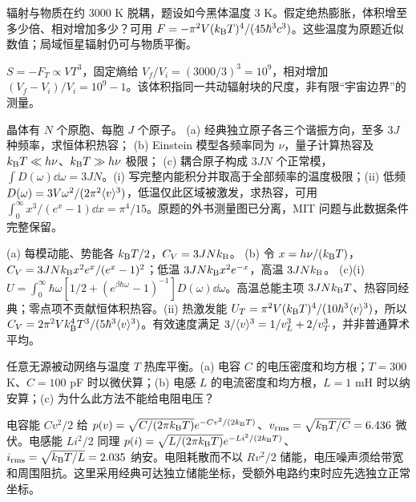 \begin{exercise}
辐射与物质在约 3000 K 脱耦，题设如今黑体温度 3 K。假定绝热膨胀，体积增至多少倍、相对增加多少？可用 $F=-\pi^2V(k_{\mathrm B} T)^4/(45\hbar^3c^3)$。这些温度为原题近似数值；局域恒星辐射仍可与物质平衡。
\end{exercise}
\begin{solution}
$S=-F_T\propto VT^3$，固定熵给 $V_f/V_i=(3000/3)^3=10^9$，相对增加 $(V_f-V_i)/V_i=10^9-1$。该体积指同一共动辐射块的尺度，非有限“宇宙边界”的测量。
\end{solution}
\begin{exercise}
晶体有 $N$ 个原胞、每胞 $J$ 个原子。
(a) 经典独立原子各三个谐振方向，至多 $3J$ 种频率，求恒体积热容；
(b) Einstein 模型各频率同为 $\nu$，量子计算热容及 $k_{\mathrm B} T\ll h\nu$、$k_{\mathrm B} T\gg h\nu$ 极限；
(c) 耦合原子构成 $3JN$ 个正常模，$\int D(\omega)\dd\omega=3JN$。(i) 写完整内能积分并取高于全部频率的温度极限；(ii) 低频 $D(\omega)=3V\omega^2/(2\pi^2\langle v\rangle^3)$，低温仅此区域被激发，求热容，可用 $\int_0^\infty x^3/(e^x-1)\dd x=\pi^4/15$。原题的外书测量图已分离，MIT 问题与此数据条件完整保留。
\end{exercise}
\begin{solution}
(a) 每模动能、势能各 $k_{\mathrm B} T/2$，$C_V=3JNk_{\mathrm B}$。
(b) 令 $x=h\nu/(k_{\mathrm B} T)$，$C_V=3JNk_{\mathrm B} x^2e^x/(e^x-1)^2$；低温 $3JNk_{\mathrm B} x^2e^{-x}$，高温 $3JNk_{\mathrm B}$。
(c)(i) $U=\int_0^\infty\hbar\omega[1/2+(e^{\beta\hbar\omega}-1)^{-1}]D(\omega)\dd\omega$。高温总能主项 $3JNk_{\mathrm B} T$、热容同经典；零点项不贡献恒体积热容。(ii) 热激发能 $U_T=\pi^2V(k_{\mathrm B} T)^4/(10\hbar^3\langle v\rangle^3)$，所以 $C_V=2\pi^2Vk_{\mathrm B}^4T^3/(5\hbar^3\langle v\rangle^3)$。有效速度满足 $3/\langle v\rangle^3=1/v_L^3+2/v_T^3$，并非普通算术平均。
\end{solution}
\begin{exercise}
任意无源被动网络与温度 $T$ 热库平衡。(a) 电容 $C$ 的电压密度和均方根；$T=300$ K、$C=100$ pF 时以微伏算；(b) 电感 $L$ 的电流密度和均方根，$L=1$ mH 时以纳安算；(c) 为什么此方法不能给电阻电压？
\end{exercise}
\begin{solution}
电容能 $Cv^2/2$ 给 $p(v)=\sqrt{C/(2\pi k_{\mathrm B} T)}e^{-Cv^2/(2k_{\mathrm B} T)}$、$v_{\rm rms}=\sqrt{k_{\mathrm B} T/C}=6.436$ 微伏。电感能 $Li^2/2$ 同理 $p(i)=\sqrt{L/(2\pi k_{\mathrm B} T)}e^{-Li^2/(2k_{\mathrm B} T)}$、$i_{\rm rms}=\sqrt{k_{\mathrm B} T/L}=2.035$ 纳安。电阻耗散而不以 $Rv^2/2$ 储能，电压噪声须给带宽和周围阻抗。这里采用经典可达独立储能坐标，受额外电路约束时应先选独立正常坐标。
\end{solution}
